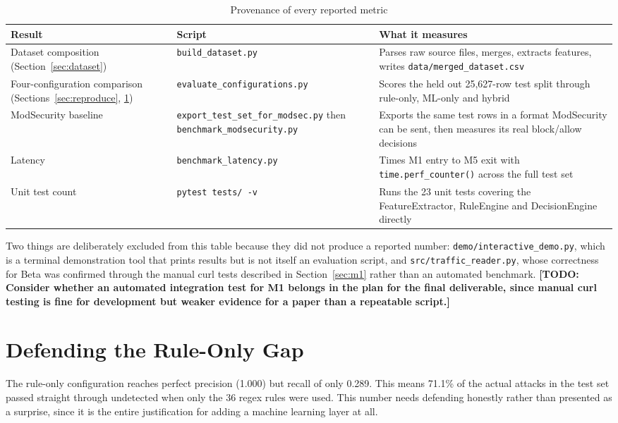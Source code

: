 \documentclass{llncs}
\newcommand{\TODO}[1]{\textbf{[TODO: #1]}}
\begin{document}
\begin{table}[h]
\centering
\caption{Provenance of every reported metric}
\label{tab:provenance}
\begin{tabular}{p{}p{}p{}}
\toprule
\textbf{Result} & \textbf{Script} & \textbf{What it measures} \\
\midrule
Dataset composition (Section~\ref{sec:dataset}) & \texttt{build\_dataset.py} &
Parses raw source files, merges, extracts features, writes
\texttt{data/merged\_dataset.csv} \\
Four-configuration comparison (Sections~\ref{sec:reproduce}, \ref{sec:defense}) &
\texttt{evaluate\_configurations.py} & Scores the held out 25{,}627-row
test split through rule-only, ML-only and hybrid \\
ModSecurity baseline & \texttt{export\_test\_set\_for\_modsec.py} then
\texttt{benchmark\_modsecurity.py} & Exports the same test rows in a
format ModSecurity can be sent, then measures its real block/allow
decisions \\
Latency & \texttt{benchmark\_latency.py} & Times M1 entry to M5 exit
with \texttt{time.perf\_counter()} across the full test set \\
Unit test count & \texttt{pytest tests/ -v} & Runs the 23 unit tests
covering the FeatureExtractor, RuleEngine and DecisionEngine directly \\
\bottomrule
\end{tabular}
\end{table}

Two things are deliberately excluded from this table because they did
not produce a reported number: \texttt{demo/interactive\_demo.py}, which
is a terminal demonstration tool that prints results but is not itself
an evaluation script, and \texttt{src/traffic\_reader.py}, whose
correctness for Beta was confirmed through the manual curl tests
described in Section~\ref{sec:m1} rather than an automated benchmark.
\TODO{Consider whether an automated integration test for M1 belongs in
the plan for the final deliverable, since manual curl testing is fine
for development but weaker evidence for a paper than a repeatable
script.}

\clearpage
\section{Defending the Rule-Only Gap}
\label{sec:defense}

The rule-only configuration reaches perfect precision (1.000) but recall
of only 0.289. This means 71.1\% of the actual attacks in the test set
passed straight through undetected when only the 36 regex rules were
used. This number needs defending honestly rather than presented as a
surprise, since it is the entire justification for adding a machine
learning layer at all.
\end{document}
